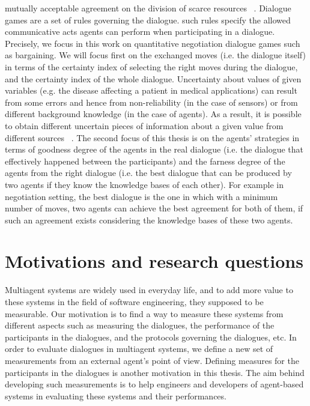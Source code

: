 mutually acceptable agreement on the division of scarce resources ~\cite{Rahwan03,Bentahar07}. Dialogue games are a set of rules governing the
dialogue. such rules specify the allowed communicative acts agents can perform when participating in  a dialogue. Precisely, we focus in this
work on quantitative negotiation dialogue games such as bargaining. We will focus first on the exchanged moves (i.e. the dialogue itself) in
terms of the certainty index of selecting the right moves during the dialogue, and the certainty index of the whole dialogue. Uncertainty about
values of given variables (e.g. the disease affecting a patient in medical applications) can result from some errors and hence from non-reliability
(in the case of sensors) or from different background knowledge (in the case of agents). As a result, it is possible to obtain different uncertain
pieces of information about a given value from different sources ~\cite{Jenhani07}. The second focus of this thesis is on the agents' strategies in
terms of goodness degree of the agents in the real dialogue (i.e. the dialogue that effectively happened between the participants) and the farness
degree of the agents from the right dialogue (i.e. the best dialogue that can be produced by two agents if they know the knowledge bases of each other).
For example in negotiation setting, the best dialogue is the one in which with a minimum number of moves, two agents can achieve the best agreement for
both of them, if such an agreement exists considering the knowledge bases of these two agents.
%



\section{Motivations and research questions}\label{sec:motivation}

Multiagent systems are widely used in everyday life, and to add more value to these systems in the field of software engineering,
they supposed to be measurable. Our motivation is to find a way to measure these systems from different aspects such as measuring
the dialogues, the performance of the participants in the dialogues, and the protocols governing the dialogues, etc. In order to evaluate
dialogues in multiagent systems, we define a new set of measurements from an external agent's point of view. Defining measures for the
participants in the dialogues is another motivation in this thesis. The aim behind developing such measurements is to help engineers and
developers of agent-based systems in evaluating these systems and their performances.\\

